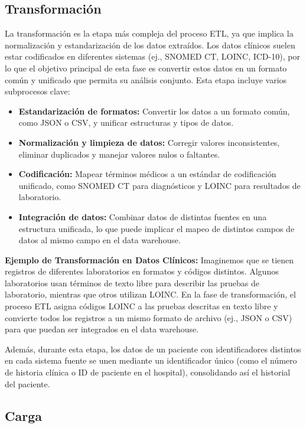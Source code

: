 \documentclass[12pt, a4paper, twoside]{article}
\begin{document}
	\subsection{Transformación}
	La transformación es la etapa más compleja del proceso ETL, ya que implica la normalización y estandarización de los datos extraídos. Los datos clínicos suelen estar codificados en diferentes sistemas (ej., SNOMED CT, LOINC, ICD-10), por lo que el objetivo principal de esta fase es convertir estos datos en un formato común y unificado que permita su análisis conjunto. Esta etapa incluye varios subprocesos clave:
	\begin{itemize}
		\item \textbf{Estandarización de formatos:} Convertir los datos a un formato común, como JSON o CSV, y unificar estructuras y tipos de datos.
		
		\item \textbf{Normalización y limpieza de datos:} Corregir valores inconsistentes, eliminar duplicados y manejar valores nulos o faltantes.
		
		\item \textbf{Codificación:} Mapear términos médicos a un estándar de codificación unificado, como SNOMED CT para diagnósticos y LOINC para resultados de laboratorio.
		
		\item \textbf{Integración de datos:} Combinar datos de distintas fuentes en una estructura unificada, lo que puede implicar el mapeo de distintos campos de datos al mismo campo en el data warehouse.
	\end{itemize}
	
	\textbf{Ejemplo de Transformación en Datos Clínicos:} Imaginemos que se tienen registros de diferentes laboratorios en formatos y códigos distintos. Algunos laboratorios usan términos de texto libre para describir las pruebas de laboratorio, mientras que otros utilizan LOINC. En la fase de transformación, el proceso ETL asigna códigos LOINC a las pruebas descritas en texto libre y convierte todos los registros a un mismo formato de archivo (ej., JSON o CSV) para que puedan ser integrados en el data warehouse.
	
	Además, durante esta etapa, los datos de un paciente con identificadores distintos en cada sistema fuente se unen mediante un identificador único (como el número de historia clínica o ID de paciente en el hospital), consolidando así el historial del paciente.
	
	\subsection{Carga}
	
\end{document}
